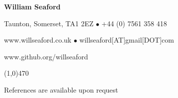 \documentclass[11pt]{article}
\begin{document}
\centerline{\LARGE \bf William Seaford}					
\centerline{Taunton, Somerset, TA1 2EZ $\bullet$ +44 (0) 7561 358 418}
\centerline{www.willseaford.co.uk $\bullet$ willseaford[AT]gmail[DOT]com}
\centerline{www.github.org/willseaford}
\noindent 												
\line(1,0){470}
\newline



\pagebreak


\centerline{References are available upon request}
\end{document}
